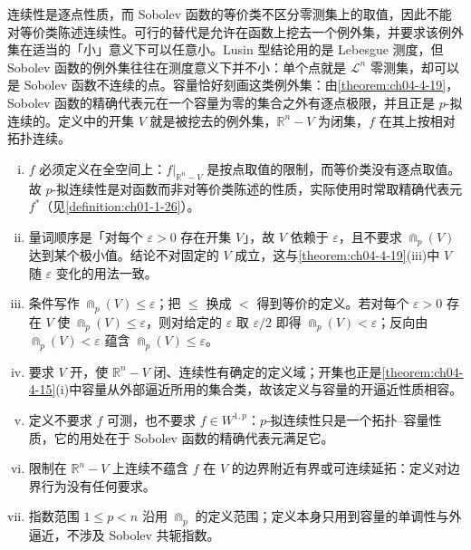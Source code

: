 \documentclass[../../main.tex]{subfiles}%
\begin{document}
\begin{remark}\label{remark:ch04-def-4-11-动机}
连续性是逐点性质，而 Sobolev 函数的等价类不区分零测集上的取值，因此不能对等价类陈述连续性。可行的替代是允许在函数上挖去一个例外集，并要求该例外集在适当的「小」意义下可以任意小。Lusin 型结论用的是 Lebesgue 测度，但 Sobolev 函数的例外集往往在测度意义下并不小：单个点就是 $\mathcal{L}^n$ 零测集，却可以是 Sobolev 函数不连续的点。容量恰好刻画这类例外集：由\cref{theorem:ch04-4-19}，Sobolev 函数的精确代表元在一个容量为零的集合之外有逐点极限，并且正是 $p$-拟连续的。定义中的开集 $V$ 就是被挖去的例外集，$\mathbb{R}^n-V$ 为闭集，$f$ 在其上按相对拓扑连续。%
\end{remark}

\begin{remark}\label{remark:ch04-def-4-11-条件}
\begin{enumerate}[(i)]
\item $f$ 必须定义在全空间上：$f|_{\mathbb{R}^n-V}$ 是按点取值的限制，而等价类没有逐点取值。故 $p$-拟连续性是对函数而非对等价类陈述的性质，实际使用时常取精确代表元 $f^*$（见\cref{definition:ch01-1-26}）。%
\item 量词顺序是「对每个 $\varepsilon>0$ 存在开集 $V$」，故 $V$ 依赖于 $\varepsilon$，且不要求 $\Cap_p(V)$ 达到某个极小值。结论不对固定的 $V$ 成立，这与\cref{theorem:ch04-4-19}(iii)中 $V$ 随 $\varepsilon$ 变化的用法一致。%
\item 条件写作 $\Cap_p(V)\leqslant\varepsilon$；把 $\leqslant$ 换成 $<$ 得到等价的定义。若对每个 $\varepsilon>0$ 存在 $V$ 使 $\Cap_p(V)\leqslant\varepsilon$，则对给定的 $\varepsilon$ 取 $\varepsilon/2$ 即得 $\Cap_p(V)<\varepsilon$；反向由 $\Cap_p(V)<\varepsilon$ 蕴含 $\Cap_p(V)\leqslant\varepsilon$。
\item 要求 $V$ 开，使 $\mathbb{R}^n-V$ 闭、连续性有确定的定义域；开集也正是\cref{theorem:ch04-4-15}(i)中容量从外部逼近所用的集合类，故该定义与容量的开逼近性质相容。%
\item 定义不要求 $f$ 可测，也不要求 $f\in W^{1,p}$：$p$-拟连续性只是一个拓扑--容量性质，它的用处在于 Sobolev 函数的精确代表元满足它。
\item 限制在 $\mathbb{R}^n-V$ 上连续不蕴含 $f$ 在 $V$ 的边界附近有界或可连续延拓：定义对边界行为没有任何要求。
\item 指数范围 $1\leqslant p<n$ 沿用 $\Cap_p$ 的定义范围；定义本身只用到容量的单调性与外逼近，不涉及 Sobolev 共轭指数。
\end{enumerate}
\end{remark}
\end{document}

